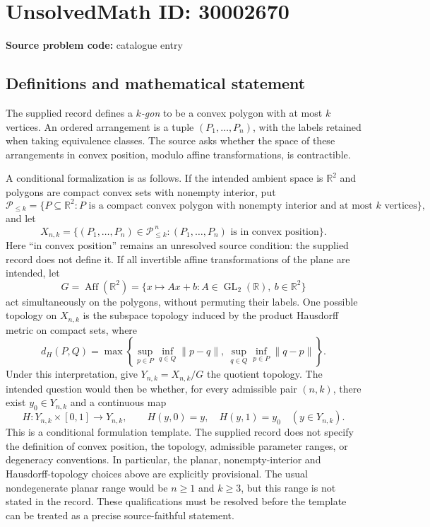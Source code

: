 \documentclass[11pt]{article}
\newcommand{\R}{\mathbb{R}}
\begin{document}
\section*{UnsolvedMath ID: 30002670}
\textbf{Source problem code:} catalogue entry
\subsection{Definitions and mathematical statement}
The supplied record defines a \emph{$k$-gon} to be a convex polygon with at most $k$ vertices. An ordered arrangement is a tuple $(P_1,\ldots,P_n)$, with the labels retained when taking equivalence classes. The source asks whether the space of these arrangements in convex position, modulo affine transformations, is contractible.

A conditional formalization is as follows. If the intended ambient space is $\R^2$ and polygons are compact convex sets with nonempty interior, put
\[
\mathcal P_{\leq k}=\{P\subseteq\R^2:P\text{ is a compact convex polygon with nonempty interior and at most }k\text{ vertices}\},
\]
and let
\[
X_{n,k}=\{(P_1,\ldots,P_n)\in\mathcal P_{\leq k}^{\,n}:(P_1,\ldots,P_n)\text{ is in convex position}\}.
\]
Here ``in convex position'' remains an unresolved source condition: the supplied record does not define it. If all invertible affine transformations of the plane are intended, let
\[
G=\operatorname{Aff}(\R^2)=\{x\mapsto Ax+b:A\in\operatorname{GL}_2(\R),\ b\in\R^2\}
\]
act simultaneously on the polygons, without permuting their labels. One possible topology on $X_{n,k}$ is the subspace topology induced by the product Hausdorff metric on compact sets, where
\[
d_H(P,Q)=\max\left\{\sup_{p\in P}\inf_{q\in Q}\|p-q\|,\ \sup_{q\in Q}\inf_{p\in P}\|q-p\|\right\}.
\]
Under this interpretation, give $Y_{n,k}=X_{n,k}/G$ the quotient topology. The intended question would then be whether, for every admissible pair $(n,k)$, there exist $y_0\in Y_{n,k}$ and a continuous map
\[
H:Y_{n,k}\times[0,1]\longrightarrow Y_{n,k},\qquad H(y,0)=y,\quad H(y,1)=y_0\quad(y\in Y_{n,k}).
\]
This is a conditional formulation template. The supplied record does not specify the definition of convex position, the topology, admissible parameter ranges, or degeneracy conventions. In particular, the planar, nonempty-interior and Hausdorff-topology choices above are explicitly provisional. The usual nondegenerate planar range would be $n\geq1$ and $k\geq3$, but this range is not stated in the record. These qualifications must be resolved before the template can be treated as a precise source-faithful statement.
\end{document}
